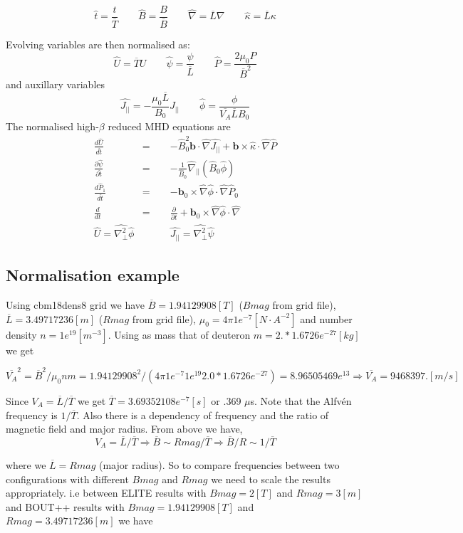 \documentclass[12pt, a4paper]{article}
\newcommand{\deriv}[2]{\ensuremath{\frac{\partial #1}{\partial #2}}}
\newcommand{\Vec}[1]{\ensuremath{\mathbf{#1}}}
\newcommand{\bvec}{\Vec{b}}
\newcommand{\Bbar}{\overline{B}}
\newcommand{\Lbar}{\overline{L}}
\newcommand{\Tbar}{\overline{T}}
\newcommand{\Jpar}{J_{||}}
\newcommand{\delp}{\nabla_\perp^2}
\begin{document}
\[
\hat{t} = \frac{t}{\Tbar} \qquad \hat{B} = \frac{B}{\Bbar} \qquad \hat{\nabla} = \Lbar\nabla \qquad \hat{\kappa} = \Lbar\kappa
\]

Evolving variables are then normalised as:
\[
\hat{U} = \Tbar U \qquad \hat{\psi} = \frac{\psi}{\Lbar} \qquad \hat{P} = \frac{2\mu_0 P}{\Bbar^2}
\]
and auxillary variables
\[
\hat{\Jpar} = -\frac{\mu_0\Lbar}{B_0}\Jpar \qquad \hat{\phi} = \frac{\phi}{\overline{V_A}\Lbar B_0}
\]
The normalised high-$\beta$ reduced MHD equations are
\begin{eqnarray*}
\frac{d\hat{U}}{d\hat{t}} &=& -\hat{B}_0^2 \bvec\cdot\hat{\nabla}\hat{\Jpar} + \bvec\times\hat{\kappa}\cdot\hat{\nabla}\hat{P} \\
\deriv{\hat{\psi}}{\hat{t}} &=& -\frac{1}{\hat{B}_0}\hat{\nabla}_{||}\left(\hat{B}_0\hat{\phi}\right) \\
\frac{d\hat{P}_1}{d\hat{t}} &=& -\bvec_0\times\hat{\nabla}\hat{\phi}\cdot\hat{\nabla}\hat{P}_0 \\
\frac{d}{dt} &=& \deriv{}{t} + \bvec_0\times\hat{\nabla}\hat{\phi}\cdot\hat{\nabla} \\
\hat{U} = \hat{\delp}\hat{\phi}  &\qquad& \hat{\Jpar} = \hat{\delp}\hat{\psi}
\end{eqnarray*}

\subsection{Normalisation example}

Using cbm18dens8 grid we have $\Bbar=1.94129908 [T]$ ($Bmag$ from grid file), $\Lbar=3.49717236 [m] $ ($Rmag$ from grid file), $\mu_0=4\pi1e^{-7} [ N \cdot A^{-2}]$ and number density $n=1e^{19} [m^{-3}]$. Using as mass that of deuteron $m=2.*1.6726e^{-27} [kg]$ we get

\[
\overline{V_A}^2 = \Bbar^2 / \mu_0 n m=1.94129908^2/(4\pi1e^{-7}1e^{19}2.0*1.6726e^{-27})=8.96505469e^{13}
\Rightarrow \overline{V_A}=9468397. [m/s]
\]

Since $V_A=\Lbar/\Tbar$ we get $\Tbar=3.69352108e^{-7} [s] $ or .369 $\mu$s. Note that the Alfv\'en frequency is $1/\Tbar$. Also there is a dependency of frequency and the ratio of magnetic field and major radius. From above we have,
\[
V_A=\Lbar/\Tbar \Rightarrow \Bbar \sim Rmag /\Tbar \Rightarrow \Bbar / R \sim 1/ \Tbar 
\]

where we $\Lbar=Rmag$ (major radius). So to compare frequencies between two configurations with different $Bmag$ and $Rmag$ we need to scale the results appropriately. i.e between ELITE results with $Bmag=2 [T]$ and $Rmag=3 [m]$ and BOUT++ results with $Bmag=1.94129908 [T]$ and $Rmag=3.49717236 [m]$ we have
\end{document}
